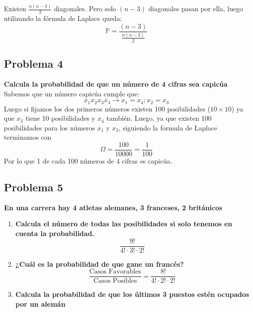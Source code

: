 \documentclass[11pt]{article}
\newcommand{\prob}{\mathbb{P}}
\newcommand{\OMG}{\varOmega}
\theoremstyle{plain}
\begin{document}
            Existen $\frac{n(n-3)}{2}$ diagonales. Pero solo $(n-3)$ diagonales pasan por ella, luego utilizando la fórmula de Laplace queda:\[\prob = \frac{(n-3)}{\frac{n(n-3)}{2}}\]
        \subsection{Problema 4} %
        \label{sub:problema_4}
            \textbf{Calcula la probabilidad de que un número de 4 cifras sea capicúa}\\
            Sabemos que un número capicúa cumple que: \[x_1x_2x_3x_4 \rightarrow x_1 = x_4 ; x_2 = x_3\] Luego si fijamos los dos primeros números existen 100 posibilidades ($10 \times 10$) ya que $x_3$ tiene 10 posibilidades y $x_4$ también. Luego, ya que existen 100 posibilidades para los números $x_1$ y $x_2$, siguiendo la formula de Laplace terminamos con \[\OMG = \frac{100}{10000} = \frac{1}{100}\]
            Por lo que 1 de cada 100 números de 4 cifras es capicúa.
        \subsection{Problema 5} %
        \label{sub:problema_5}
        \textbf{En una carrera hay 4 atletas alemanes, 3 franceses, 2 británicos}
        \begin{enumerate}[label=\Alph*]
            \item \textbf{Calcula el número de todas las posibilidades si solo tenemos en cuenta la probabilidad.} \[\frac{9!}{4! \cdot 3! \cdot 2!}\]
            \item \textbf{¿Cuál es la probabilidad de que gane un francés?} \[\frac{\text{Casos Favorables}}{\text{Casos Posibles}} = \frac{8!}{4!\cdot 2! \cdot 2!}\]
            \item \textbf{Calcula la probabilidad de que los últimos 3 puestos estén ocupados por un alemán}
        \end{enumerate}
\end{document}

